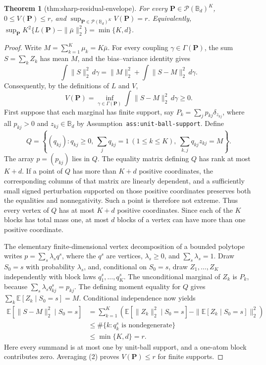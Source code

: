 \documentclass{article}
\newtheorem{theorem}{Theorem}
\begin{document}
\begin{theorem}[thm:sharp-residual-envelope]\label{thm:sharp-residual-envelope}
For every \(\mathbf P\in\mathcal P(\mathbb B_d)^K\), \(0\le V(\mathbf P)\le r\), and \(\sup_{\mathbf P\in\mathcal P(\mathbb B_d)^K}V(\mathbf P)=r\). Equivalently, \(\sup_{\mathbf P}K^2\{L(\mathbf P)-\|\bar\mu\|_2^2\}=\min\{K,d\}\).
\end{theorem}
\begin{proof}
Write \(M=\sum_{k=1}^K\mu_k=K\bar\mu\). For every coupling \(\gamma\in\Gamma(\mathbf P)\), the sum \(S=\sum_kZ_k\) has mean \(M\), and the bias--variance identity gives
\[
\int\|S\|_2^2\,d\gamma=\|M\|_2^2+\int\|S-M\|_2^2\,d\gamma.
\]
Consequently, by the definitions of \(L\) and \(V\),
\[
V(\mathbf P)=\inf_{\gamma\in\Gamma(\mathbf P)}\int\|S-M\|_2^2\,d\gamma\ge0. \tag{1}
\]
First suppose that each marginal has finite support, say \(P_k=\sum_jp_{kj}\delta_{z_{kj}}\), where all \(p_{kj}>0\) and \(z_{kj}\in\mathbb B_d\) by Assumption~\texttt{ass:unit-ball-support}. Define
\[
Q=\left\{(q_{kj}):q_{kj}\ge0,\ \sum_jq_{kj}=1\ (1\le k\le K),\
\sum_{k,j}q_{kj}z_{kj}=M\right\}.
\]
The array \(p=(p_{kj})\) lies in \(Q\). The equality matrix defining \(Q\) has rank at most \(K+d\). If a point of \(Q\) has more than \(K+d\) positive coordinates, the corresponding columns of that matrix are linearly dependent, and a sufficiently small signed perturbation supported on those positive coordinates preserves both the equalities and nonnegativity. Such a point is therefore not extreme. Thus every vertex of \(Q\) has at most \(K+d\) positive coordinates. Since each of the \(K\) blocks has total mass one, at most \(d\) blocks of a vertex can have more than one positive coordinate.

The elementary finite-dimensional vertex decomposition of a bounded polytope writes \(p=\sum_s\lambda_sq^s\), where the \(q^s\) are vertices, \(\lambda_s\ge0\), and \(\sum_s\lambda_s=1\). Draw \(S_0=s\) with probability \(\lambda_s\), and, conditional on \(S_0=s\), draw \(Z_1,\ldots,Z_K\) independently with block laws \(q^s_1,\ldots,q^s_K\). The unconditional marginal of \(Z_k\) is \(P_k\), because \(\sum_s\lambda_sq^s_{kj}=p_{kj}\). The defining moment equality for \(Q\) gives \(\sum_k\mathbb E[Z_k\mid S_0=s]=M\). Conditional independence now yields
\[
\begin{aligned}
\mathbb E[\|S-M\|_2^2\mid S_0=s]
&=\sum_{k=1}^K\left(\mathbb E[\|Z_k\|_2^2\mid S_0=s]
-\|\mathbb E[Z_k\mid S_0=s]\|_2^2\right)\\
&\le \#\{k:q_k^s\text{ is nondegenerate}\}\\
&\le\min\{K,d\}=r. \tag{2}
\end{aligned}
\]
Here every summand is at most one by unit-ball support, and a one-atom block contributes zero. Averaging (2) proves \(V(\mathbf P)\le r\) for finite supports.


\end{proof}
\end{document}
